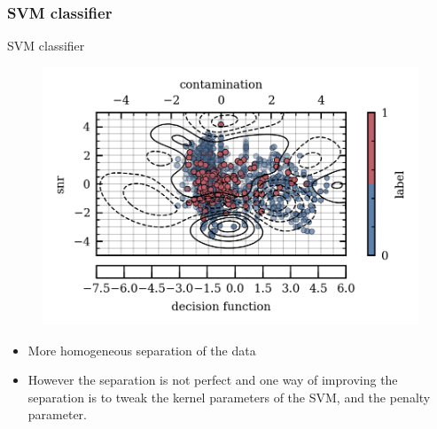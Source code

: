 \documentclass[numbering=fraction]{beamer}
\begin{document}
\subsubsection{SVM classifier}
\begin{frame}{SVM classifier}
    \begin{figure}[H]
        \centering
        \includegraphics[width=0.6\linewidth]{figure/decision_function_working_6.png}
    \end{figure}
    \begin{itemize}
        \item More homogeneous separation of the data
        \item However the separation is not perfect and one way of improving the separation is to tweak the kernel parameters of the SVM, and the penalty parameter.
    \end{itemize}
\end{frame}
\end{document}
